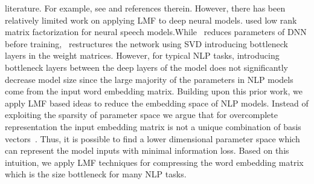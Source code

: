 literature. For example, see \cite{recht2013parallel} and references therein. 
However, there has been  relatively limited work on applying LMF to deep neural models. \cite{sainath2013low,lu2016learning} used low rank matrix factorization for neural speech models.While~\cite{sainath2013low}
reduces parameters of DNN before training,~\cite{xue2013restructuring}
restructures the network using SVD introducing bottleneck layers in the weight
matrices. However, for typical NLP tasks, introducing bottleneck layers between the deep layers of the model does not significantly decrease model size since the large majority of the parameters in NLP models come from the input word embedding matrix.
Building upon this prior work, we apply LMF based ideas to reduce the embedding space of NLP models. Instead of exploiting the sparsity of parameter space we argue that for overcomplete representation the input embedding matrix is not a unique combination of basis vectors~\cite{lewicki2000learning}. Thus, it is possible to find a lower dimensional parameter space which can represent the model inputs with minimal information loss. Based on this intuition, we apply LMF techniques for compressing the word embedding matrix which is the size bottleneck for many NLP tasks. 





